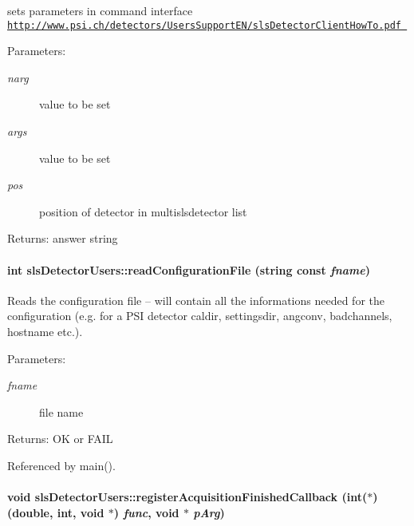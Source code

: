 sets parameters in command interface \href{http://www.psi.ch/detectors/UsersSupportEN/slsDetectorClientHowTo.pdf}\tt{http://www.psi.ch/detectors/Users\-Support\-EN/sls\-Detector\-Client\-How\-To.pdf} 

\begin{Desc}
\item[Parameters:]
\begin{description}
\item[{\em narg}]value to be set \item[{\em args}]value to be set \item[{\em pos}]position of detector in multislsdetector list \end{description}
\end{Desc}
\begin{Desc}
\item[Returns:]answer string \end{Desc}
\hypertarget{classslsDetectorUsers_8aeda7c2cbc270c7f8756761823e8d95}{
\paragraph[readConfigurationFile]{\setlength{\rightskip}{0pt plus 5cm}int sls\-Detector\-Users::read\-Configuration\-File (string const  {\em fname})}\hfill}
\label{classslsDetectorUsers_8aeda7c2cbc270c7f8756761823e8d95}


Reads the configuration file -- will contain all the informations needed for the configuration (e.g. for a PSI detector caldir, settingsdir, angconv, badchannels, hostname etc.). 

\begin{Desc}
\item[Parameters:]
\begin{description}
\item[{\em fname}]file name \end{description}
\end{Desc}
\begin{Desc}
\item[Returns:]OK or FAIL \end{Desc}


Referenced by main().\hypertarget{classslsDetectorUsers_2a85e28ff08e3ec1e08bea3ba7d0fb08}{
\paragraph[registerAcquisitionFinishedCallback]{\setlength{\rightskip}{0pt plus 5cm}void sls\-Detector\-Users::register\-Acquisition\-Finished\-Callback (int($\ast$)(double, int, void $\ast$) {\em func}, void $\ast$ {\em p\-Arg})}\hfill}
\label{classslsDetectorUsers_2a85e28ff08e3ec1e08bea3ba7d0fb08}


